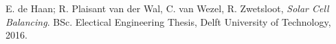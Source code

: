 \documentclass[a4paper,journal]{DDREAM}
\begin{document}



\ifCLASSOPTIONcaptionsoff
  \newpage
\fi



%
%
%

\begin{thebibliography}{1}

E. de Haan; R. Plaisant van der Wal, C. van Wezel, R. Zwetsloot, \emph{Solar Cell Balancing}. BSc. Electical Engineering Thesis, Delft University of Technology, 2016.

\end{thebibliography}
\end{document}

